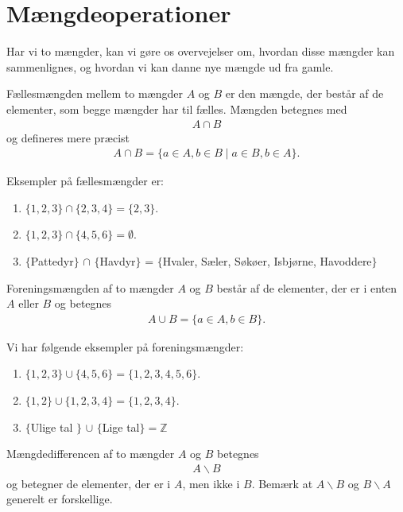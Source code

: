 \section*{Mængdeoperationer}
Har vi to mængder, kan vi gøre os overvejelser om, hvordan disse mængder kan sammenlignes, og hvordan vi kan danne nye mængde ud fra gamle. 
\begin{defn}[Fællesmængde]
Fællesmængden mellem to mængder $A$ og $B$ er den mængde, der består af de elementer, som begge mængder har til fælles. Mængden betegnes med
\begin{align*}
A\cap B
\end{align*}
og defineres mere præcist
\begin{align*}
A\cap B = \{a\in A, b\in B \mid a\in B, b\in A\}.
\end{align*}
\end{defn}

\begin{exa}
Eksempler på fællesmængder er:
\begin{enumerate}[label=\roman*)]
\item $\{1,2,3\} \cap \{2,3,4\} = \{2,3\}$.
\item $\{1,2,3\} \cap \{4,5,6\} = \emptyset$.
\item      $\{$Pattedyr$\}$ $\cap$ $\{$Havdyr$\}$ = $\{$Hvaler, Sæler, Søkøer, Isbjørne, Havoddere$\}$
\end{enumerate}
\end{exa}

\begin{defn}[Foreningsmængde]
Foreningsmængden af to mængder $A$ og $B$ består af de elementer, der er i enten $A$ eller $B$ og betegnes
\begin{align*}
A\cup B = \{a\in A, b\in B\}.
\end{align*}
\end{defn}
\begin{exa}
Vi har følgende eksempler på foreningsmængder:
\begin{enumerate}[label=\roman*)]
\item $\{1,2,3\} \cup \{4,5,6\} = \{1,2,3,4,5,6\}$.
\item $\{1,2\} \cup \{1,2,3,4\} = \{1,2,3,4\}$.
\item $\{$Ulige tal $\}$ $\cup$ $\{$Lige tal$\}=\mathbb{Z}$ 
\end{enumerate}
\end{exa}
\begin{defn}
Mængdedifferencen af to mængder $A$ og $B$ betegnes
\begin{align*}
A \backslash B
\end{align*}
og betegner de elementer, der er i $A$, men ikke i $B$. Bemærk at $A\backslash B$ og $B \backslash A$ generelt er forskellige.
\end{defn}


